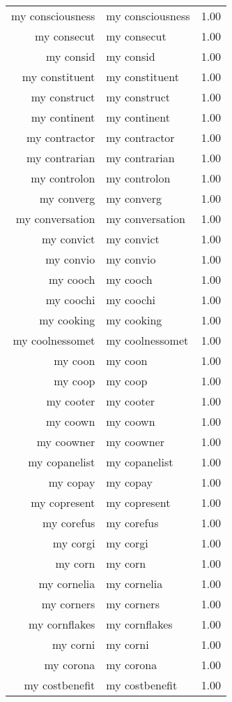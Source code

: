 \begin{table}[ht]
\begin{tabular}{rlr}
  my consciousness & my consciousness & 1.00 \\ 
  my consecut & my consecut & 1.00 \\ 
  my consid & my consid & 1.00 \\ 
  my constituent & my constituent & 1.00 \\ 
  my construct & my construct & 1.00 \\ 
  my continent & my continent & 1.00 \\ 
  my contractor & my contractor & 1.00 \\ 
  my contrarian & my contrarian & 1.00 \\ 
  my controlon & my controlon & 1.00 \\ 
  my converg & my converg & 1.00 \\ 
  my conversation & my conversation & 1.00 \\ 
  my convict & my convict & 1.00 \\ 
  my convio & my convio & 1.00 \\ 
  my cooch & my cooch & 1.00 \\ 
  my coochi & my coochi & 1.00 \\ 
  my cooking & my cooking & 1.00 \\ 
  my coolnessomet & my coolnessomet & 1.00 \\ 
  my coon & my coon & 1.00 \\ 
  my coop & my coop & 1.00 \\ 
  my cooter & my cooter & 1.00 \\ 
  my coown & my coown & 1.00 \\ 
  my coowner & my coowner & 1.00 \\ 
  my copanelist & my copanelist & 1.00 \\ 
  my copay & my copay & 1.00 \\ 
  my copresent & my copresent & 1.00 \\ 
  my corefus & my corefus & 1.00 \\ 
  my corgi & my corgi & 1.00 \\ 
  my corn & my corn & 1.00 \\ 
  my cornelia & my cornelia & 1.00 \\ 
  my corners & my corners & 1.00 \\ 
  my cornflakes & my cornflakes & 1.00 \\ 
  my corni & my corni & 1.00 \\ 
  my corona & my corona & 1.00 \\ 
  my costbenefit & my costbenefit & 1.00 \\ 

\end{tabular}
\end{table}

